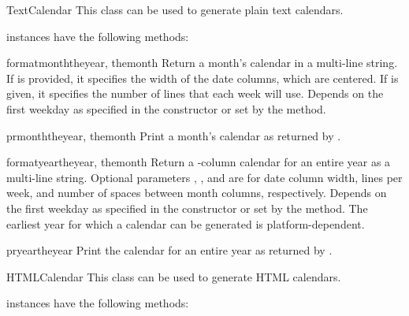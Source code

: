 \begin{classdesc}{TextCalendar}{}
This class can be used to generate plain text calendars.

\end{classdesc}

 instances have the following methods:

\begin{methoddesc}{formatmonth}{theyear, themonth}
Return a month's calendar in a multi-line string. If  is
provided, it specifies the width of the date columns, which are
centered. If  is given, it specifies the number of lines that
each week will use. Depends on the first weekday as specified in the constructor
or set by the  method.
\end{methoddesc}

\begin{methoddesc}{prmonth}{theyear, themonth}
Print a month's calendar as returned by .
\end{methoddesc}

\begin{methoddesc}{formatyear}{theyear, themonth}
Return a -column calendar for an entire year as a multi-line string.
Optional parameters , , and  are for date column
width, lines per week, and number of spaces between month columns,
respectively. Depends on the first weekday as specified in the constructor or
set by the  method.  The earliest year for which a
calendar can be generated is platform-dependent.
\end{methoddesc}

\begin{methoddesc}{pryear}{theyear}
Print the calendar for an entire year as returned by .
\end{methoddesc}


\begin{classdesc}{HTMLCalendar}{}
This class can be used to generate HTML calendars.

\end{classdesc}

 instances have the following methods:

